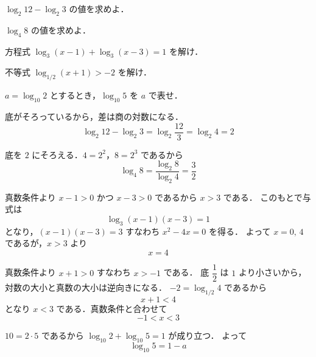 \documentclass[lualatex,paper=b5j,fontsize=10pt,twoside]{jlreq}
\begin{document}
\MakeMathMagazineTitle

\begin{mmproblems}
  \item $\log_2 12-\log_2 3$ の値を求めよ．

  \item $\log_4 8$ の値を求めよ．

  \item 方程式 $\log_3(x-1)+\log_3(x-3)=1$ を解け．

  \item 不等式 $\log_{1/2}(x+1)>-2$ を解け．

  \item $a=\log_{10}2$ とするとき，$\log_{10}5$ を $a$ で表せ．
\end{mmproblems}


\begin{mmproblems}
  \item 底がそろっているから，差は商の対数になる．
    \[
      \log_2 12-\log_2 3=\log_2\dfrac{12}{3}=\log_2 4=2
    \]

  \item 底を $2$ にそろえる．$4=2^2$，$8=2^3$ であるから
    \[
      \log_4 8=\dfrac{\log_2 8}{\log_2 4}=\dfrac{3}{2}
    \]

  \item 真数条件より $x-1>0$ かつ $x-3>0$ であるから $x>3$ である．
    このもとで与式は
    \[
      \log_3(x-1)(x-3)=1
    \]
    となり，$(x-1)(x-3)=3$ すなわち $x^2-4x=0$ を得る．
    よって $x=0,\,4$ であるが，$x>3$ より
    \[
      x=4
    \]

  \item 真数条件より $x+1>0$ すなわち $x>-1$ である．
    底 $\dfrac{1}{2}$ は $1$ より小さいから，対数の大小と真数の大小は逆向きになる．
    $-2=\log_{1/2}4$ であるから
    \[
      x+1<4
    \]
    となり $x<3$ である．真数条件と合わせて
    \[
      -1<x<3
    \]

  \item $10=2\cdot 5$ であるから $\log_{10}2+\log_{10}5=1$ が成り立つ．
    よって
    \[
      \log_{10}5=1-a
    \]
\end{mmproblems}

\end{document}
